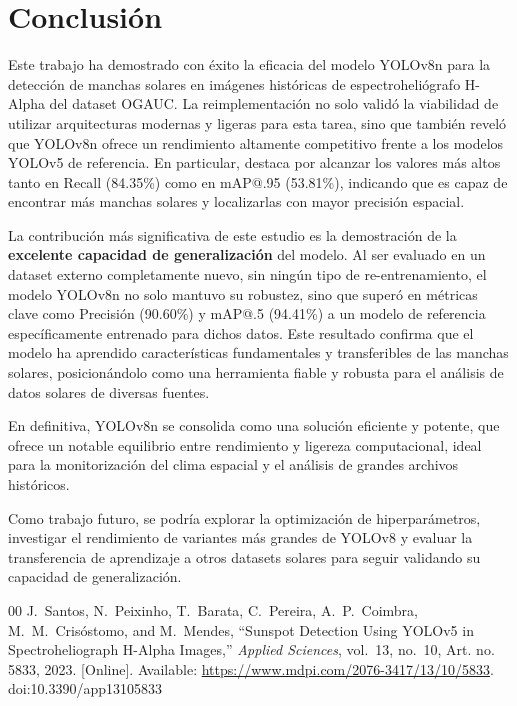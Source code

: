 \documentclass[journal]{IEEEtran}
\begin{document}
\section{Conclusión}
Este trabajo ha demostrado con éxito la eficacia del modelo YOLOv8n para la detección de manchas solares en imágenes históricas de espectroheliógrafo H-Alpha del dataset OGAUC. La reimplementación no solo validó la viabilidad de utilizar arquitecturas modernas y ligeras para esta tarea, sino que también reveló que YOLOv8n ofrece un rendimiento altamente competitivo frente a los modelos YOLOv5 de referencia. En particular, destaca por alcanzar los valores más altos tanto en Recall (84.35\%) como en mAP@.95 (53.81\%), indicando que es capaz de encontrar más manchas solares y localizarlas con mayor precisión espacial.

La contribución más significativa de este estudio es la demostración de la \textbf{excelente capacidad de generalización} del modelo. Al ser evaluado en un dataset externo completamente nuevo, sin ningún tipo de re-entrenamiento, el modelo YOLOv8n no solo mantuvo su robustez, sino que superó en métricas clave como Precisión (90.60\%) y mAP@.5 (94.41\%) a un modelo de referencia específicamente entrenado para dichos datos. Este resultado confirma que el modelo ha aprendido características fundamentales y transferibles de las manchas solares, posicionándolo como una herramienta fiable y robusta para el análisis de datos solares de diversas fuentes.

En definitiva, YOLOv8n se consolida como una solución eficiente y potente, que ofrece un notable equilibrio entre rendimiento y ligereza computacional, ideal para la monitorización del clima espacial y el análisis de grandes archivos históricos.

Como trabajo futuro, se podría explorar la optimización de hiperparámetros, investigar el rendimiento de variantes más grandes de YOLOv8 y evaluar la transferencia de aprendizaje a otros datasets solares para seguir validando su capacidad de generalización.


\begin{thebibliography}{00}
    J.~Santos, N.~Peixinho, T.~Barata, C.~Pereira, A.~P.~Coimbra, M.~M.~Crisóstomo, and M.~Mendes, ``Sunspot Detection Using YOLOv5 in Spectroheliograph H-Alpha Images,'' \emph{Applied Sciences}, vol.~13, no.~10, Art. no. 5833, 2023. [Online]. Available: \url{https://www.mdpi.com/2076-3417/13/10/5833}. doi:10.3390/app13105833
\end{thebibliography}
\end{document}
